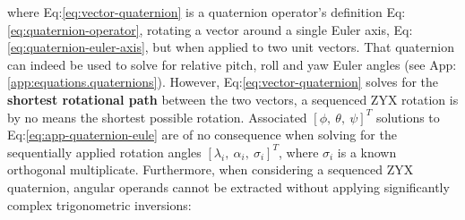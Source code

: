 where Eq:\ref{eq:vector-quaternion} is a quaternion operator's definition Eq:\ref{eq:quaternion-operator}, rotating a vector around a single Euler axis, Eq:\ref{eq:quaternion-euler-axis}, but when applied to two unit vectors. That quaternion can indeed be used to solve for relative pitch, roll and yaw Euler angles (see App:\ref{app:equations.quaternions}). However, Eq:\ref{eq:vector-quaternion} solves for the \textbf{shortest rotational path} between the two vectors, a sequenced ZYX rotation is by no means the shortest possible rotation. Associated $[\phi,~\theta,~\psi]^T$ solutions to Eq:\ref{eq:app-quaternion-eule} are of no consequence when solving for the sequentially applied rotation angles $[\lambda_i,~\alpha_i,~\sigma_i]^T$, where $\sigma_i$ is a known orthogonal multiplicate. Furthermore, when considering a sequenced ZYX quaternion, angular operands cannot be extracted without applying significantly complex trigonometric inversions:

